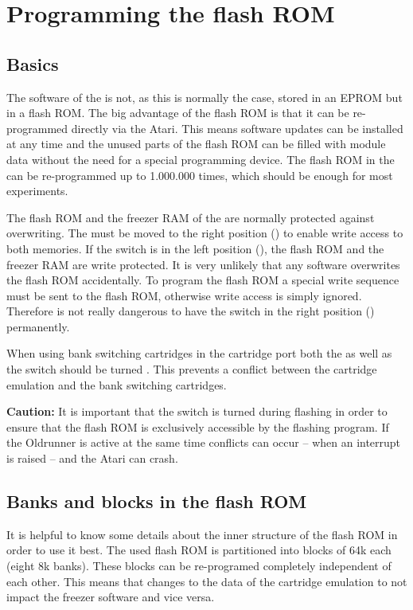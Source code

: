 \chapter{Programming the flash ROM}

\section{Basics}
The software of the \frzs is not, as this is normally the case, stored in an
EPROM but in a flash ROM. The big advantage of the flash ROM is that it can be
re- programmed directly via the Atari. This means software updates can be
installed at any time and the unused parts of the flash ROM can be filled with
module data without the need for a special programming device. The flash ROM in
the \frz can be re-programmed up to 1.000.000 times, which should be enough for
most experiments.

The flash ROM and the freezer RAM of the \frz are normally protected against
overwriting. The  must be moved to the right position
() to enable write access to both memories. If the switch is in the left position
(), the flash ROM and the freezer RAM are write protected. It is very
unlikely that any software overwrites the flash ROM accidentally. To program
the flash ROM a special write sequence must be sent to the flash ROM, otherwise
write access is simply ignored. Therefore is not really dangerous to have the
 switch in the right position () permanently.

When using  bank switching cartridges in the cartridge port both the\linebreak
{} as well as the  switch should be turned .
This prevents a conflict between the cartridge emulation and the bank switching
cartridges.\newline

\textbf{Caution:} It is important that the  switch is turned
 during flashing in order to ensure that the flash ROM is exclusively
accessible by the flashing program. If the Oldrunner is active at the same time
conflicts can occur -- \eg when an interrupt is raised -- and the Atari can crash.

\section{Banks and blocks in the flash ROM}
It is helpful to know some details about the inner structure of the flash
ROM in order to use it best. The used flash ROM is partitioned into blocks of
64k each (\ie eight 8k banks). These blocks can be re-programed completely
independent of each other. This means that \eg changes to the data of the
cartridge emulation to not impact the freezer software and vice versa.

